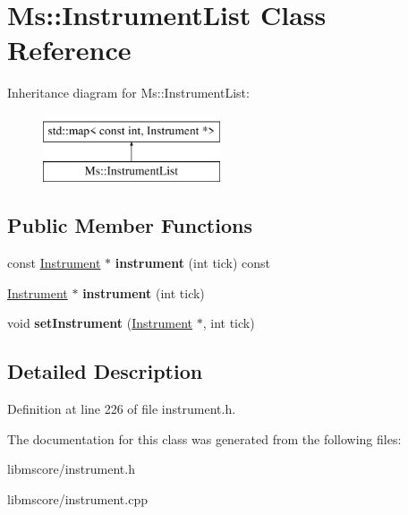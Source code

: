 \hypertarget{class_ms_1_1_instrument_list}{}\section{Ms\+:\+:Instrument\+List Class Reference}
\label{class_ms_1_1_instrument_list}
Inheritance diagram for Ms\+:\+:Instrument\+List\+:\begin{figure}[H]
\begin{center}
\leavevmode
\includegraphics[height=2.000000cm]{class_ms_1_1_instrument_list}
\end{center}
\end{figure}
\subsection*{Public Member Functions}
\begin{DoxyCompactItemize}
\item 
\mbox{\label{class_ms_1_1_instrument_list_af03d45f3b1391a5cd3f160f7ff3add01}} 
const \hyperlink{class_ms_1_1_instrument}{Instrument} $\ast$ {\bfseries instrument} (int tick) const
\item 
\mbox{\label{class_ms_1_1_instrument_list_a7a68643a8c58b39264fa18865d1b0563}} 
\hyperlink{class_ms_1_1_instrument}{Instrument} $\ast$ {\bfseries instrument} (int tick)
\item 
\mbox{\label{class_ms_1_1_instrument_list_a4aeeb4bbebd1daa48448c0b75460ac7d}} 
void {\bfseries set\+Instrument} (\hyperlink{class_ms_1_1_instrument}{Instrument} $\ast$, int tick)
\end{DoxyCompactItemize}


\subsection{Detailed Description}


Definition at line 226 of file instrument.\+h.



The documentation for this class was generated from the following files\+:\begin{DoxyCompactItemize}
\item 
libmscore/instrument.\+h\item 
libmscore/instrument.\+cpp\end{DoxyCompactItemize}
